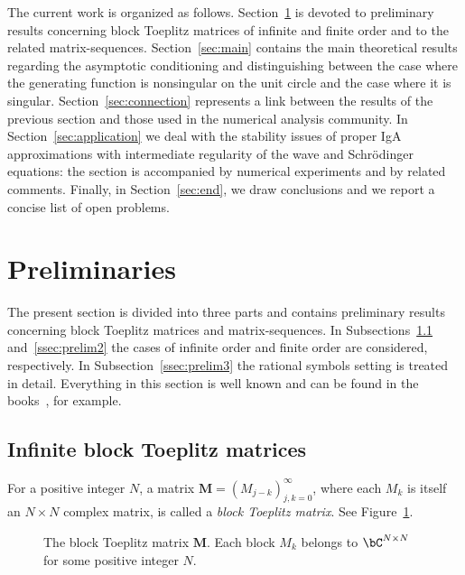 \documentclass[addpoints,12pt,letter]{article}
\newcommand{\nf}{\infty}
\renewcommand{\d}{\dif}
\numberwithin{equation}{section}
\theoremstyle{definition}
\begin{document}
The current work is organized as follows.
Section~\ref{sec:prelim} is devoted to preliminary results concerning block Toeplitz matrices of infinite and finite order and to the related matrix-sequences.
Section~\ref{sec:main} contains the main theoretical results regarding the asymptotic conditioning and distinguishing between the case where the generating function is nonsingular on the unit circle and the case where it is singular.
Section~\ref{sec:connection} represents a link between the results of the previous section and those used in the numerical analysis community.
In Section~\ref{sec:application} we deal with the stability issues of proper IgA approximations with intermediate regularity of the wave and Schrödinger equations: the section is accompanied by numerical experiments and by related comments.
Finally, in Section~\ref{sec:end}, we draw conclusions and we report a concise list of open problems.

\section{Preliminaries}\label{sec:prelim}

The present section is divided into three parts and contains preliminary results concerning block Toeplitz matrices and matrix-sequences.
In Subsections~\ref{ssec:prelim1} and~\ref{ssec:prelim2} the cases of infinite order and finite order are considered, respectively.
In Subsection~\ref{ssec:prelim3} the rational symbols setting is treated in detail.
Everything in this section is well known and can be found in the books~\cite{BoSi99,GoFe}, for example.

\subsection{Infinite block Toeplitz matrices}\label{ssec:prelim1}

For a positive integer $N$, a matrix $\mathbf{M}=(M_{j-k})_{j,k=0}^{\nf}$, where each $M_{k}$ is itself an $N\times N$ complex matrix, is called a {\em block Toeplitz matrix}.
See Figure~\ref{fg:Block}.

\begin{figure}[h]
\centering
{}
\caption{The block Toeplitz matrix $\mathbf{M}$.
Each block $M_{k}$ belongs to $\bC^{N\times N}$ for some positive integer $N$.}
\label{fg:Block}
\end{figure}
\end{document}
